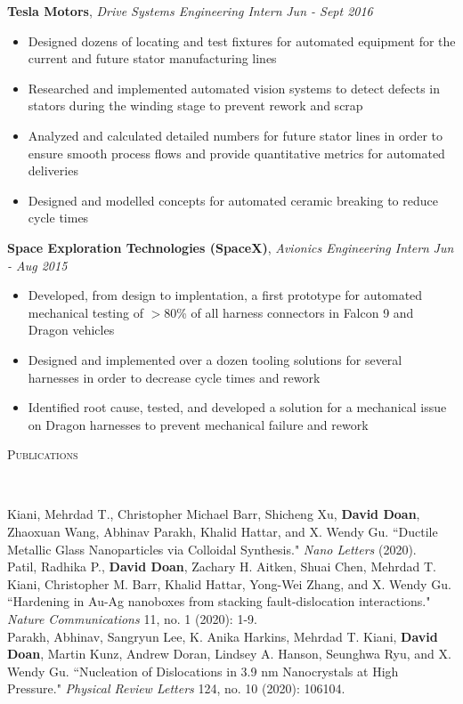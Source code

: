 \documentclass[9pt]{article}
\newenvironment{changemargin}[2]{%
  \begin{list}{}{%
    \setlength{\topsep}{0pt}%
    \setlength{\leftmargin}{#1}%
    \setlength{\rightmargin}{#2}%
    \setlength{\listparindent}{\parindent}%
    \setlength{\itemindent}{\parindent}%
    \setlength{\parsep}{\parskip}%
  }%
  \item[]}{\end{list}
}
\newcommand{\lineover}{
	\begin{changemargin}{-0.05in}{-0.05in}
		\vspace*{-8pt}
		\hrulefill \\
		\vspace*{-2pt}
	\end{changemargin}
}
\newcommand{\header}[1]{
	\begin{changemargin}{-0.5in}{-0.5in}
		\scshape{#1}\\
  	\lineover
	\end{changemargin}
}
\newcommand{\jobdescription}[1]{
	\begin{changemargin}{0.15in}{0.15in}
    \smallskip
		{#1}
    \medskip
	\end{changemargin}
}
\newcommand{\jobtitle}[3]{
	\textbf{#1}, \emph{#2} \hfill \emph{#3}\\
}
\newenvironment{body} {
	\vspace*{-16pt}
	\begin{changemargin}{-0.25in}{-0.5in}
  }	
	{\end{changemargin}
}
\begin{document}
\begin{body}
  \jobtitle{Tesla Motors}{Drive Systems Engineering Intern}{Jun - Sept 2016}
  \jobdescription{
  	\begin{itemize} \itemsep -0pt  %
  		\item Designed dozens of locating and test fixtures for automated equipment for the current and future stator manufacturing lines  		
  		\item Researched and implemented automated vision systems to detect defects in stators during the winding stage to prevent rework and scrap
  		\item Analyzed and calculated detailed numbers for future stator lines in order to ensure smooth process flows and provide quantitative metrics for automated deliveries
  		\item Designed and modelled concepts for automated ceramic breaking to reduce cycle times
  	\end{itemize}
  }

  \jobtitle{Space Exploration Technologies (SpaceX)}{Avionics Engineering Intern}{Jun - Aug 2015}
  \jobdescription{
  	\begin{itemize} \itemsep -0pt  %
  		\item Developed, from design to implentation, a first prototype for automated mechanical testing of $>$80\% of all harness connectors in Falcon 9 and Dragon vehicles
  		\item Designed and implemented over a dozen tooling solutions for several harnesses in order to decrease cycle times and rework
  		\item Identified root cause, tested, and developed a solution for a mechanical issue on Dragon harnesses to prevent mechanical failure and rework
  	\end{itemize}
  }
\end{body}
\smallskip
\header{Publications}
\begin{body}
	\vspace{14pt}
	Kiani, Mehrdad T., Christopher Michael Barr, Shicheng Xu, \textbf{David Doan}, Zhaoxuan Wang, Abhinav Parakh, Khalid Hattar, and X. Wendy Gu. ``Ductile Metallic Glass Nanoparticles via Colloidal Synthesis." \textit{Nano Letters} (2020).\\	
	\medskip
	Patil, Radhika P., \textbf{David Doan}, Zachary H. Aitken, Shuai Chen, Mehrdad T. Kiani, Christopher M. Barr, Khalid Hattar, Yong-Wei Zhang, and X. Wendy Gu. ``Hardening in Au-Ag nanoboxes from stacking fault-dislocation interactions." \textit{Nature Communications} 11, no. 1 (2020): 1-9.\\
	\medskip
	Parakh, Abhinav, Sangryun Lee, K. Anika Harkins, Mehrdad T. Kiani, \textbf{David Doan}, Martin Kunz, Andrew Doran, Lindsey A. Hanson, Seunghwa Ryu, and X. Wendy Gu. ``Nucleation of Dislocations in 3.9 nm Nanocrystals at High Pressure." \textit{Physical Review Letters} 124, no. 10 (2020): 106104.
\end{body}
\end{document}
